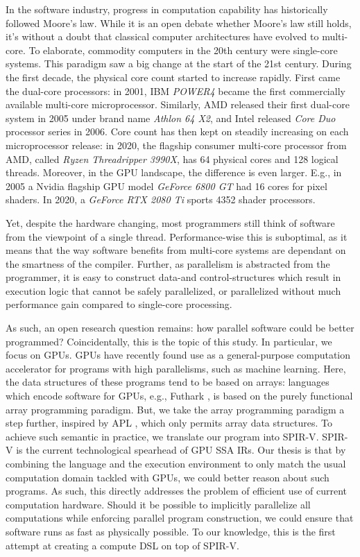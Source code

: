 \documentclass{IEEEtran}
\begin{document}
In the software industry, progress in computation capability has historically followed Moore's law. While it is an open debate whether Moore's law still holds, it's without a doubt that classical computer architectures have evolved to multi-core. To elaborate, commodity computers in the 20th century were single-core systems. This paradigm saw a big change at the start of the 21st century. During the first decade, the physical core count started to increase rapidly. First came the dual-core processors: in 2001, IBM \textit{POWER4} became the first commercially available multi-core microprocessor. Similarly, AMD released their first dual-core system in 2005 under brand name \textit{Athlon 64 X2}, and Intel released \textit{Core Duo} processor series in 2006. Core count has then kept on steadily increasing on each microprocessor release: in 2020, the flagship consumer multi-core processor from AMD, called \textit{Ryzen Threadripper 3990X}, has 64 physical cores and 128 logical threads. Moreover, in the \gls{GPU} landscape, the difference is even larger. E.g., in 2005 a Nvidia flagship GPU model \textit{GeForce 6800 GT} had 16 cores for pixel shaders. In 2020, a \textit{GeForce RTX 2080 Ti} sports 4352 shader processors.

Yet, despite the hardware changing, most programmers still think of software from the viewpoint of a single thread. Performance-wise this is suboptimal, as it means that the way software benefits from multi-core systems are dependant on the smartness of the compiler. Further, as parallelism is abstracted from the programmer, it is easy to construct data-and control-structures which result in execution logic that cannot be safely parallelized, or parallelized without much performance gain compared to single-core processing.

As such, an open research question remains: how parallel software could be better programmed? Coincidentally, this is the topic of this study. In particular, we focus on \glspl{GPU}. \glspl{GPU} have recently found use as a general-purpose computation accelerator for programs with high parallelisms, such as machine learning. Here, the data structures of these programs tend to be based on arrays: languages which encode software for \glspl{GPU}, e.g., Futhark \cite{Henriksen:2017:FPF:3062341.3062354}, is based on the purely functional array programming paradigm. But, we take the array programming paradigm a step further, inspired by \gls{APL} \cite{hui2020apl}, which only permits array data structures. To achieve such semantic in practice, we translate our program into \gls{SPIR-V}. \gls{SPIR-V} is the current technological spearhead of \gls{GPU} \gls{SSA} \glspl{IR}. Our thesis is that by combining the language and the execution environment to only match the usual computation domain tackled with \glspl{GPU}, we could better reason about such programs. As such, this directly addresses the problem of efficient use of current computation hardware. Should it be possible to implicitly parallelize all computations while enforcing parallel program construction, we could ensure that software runs as fast as physically possible. To our knowledge, this is the first attempt at creating a compute \gls{DSL} on top of \gls{SPIR-V}.
\end{document}
